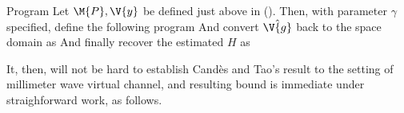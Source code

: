 \Result
{Program}
{
Let \(\M{P}, \V{y}\) be defined just above in ().
Then, with parameter \(\gamma\) specified, define the following program
%
%
And convert \(\hat{\V{g}}\) back to the space domain as
%
%
And finally recover the estimated \(H\) as
%
%
}

It, then, will not be hard to establish Cand\`es and Tao's result to the setting of millimeter wave virtual channel, and resulting bound is immediate under straighforward work, as follows.
